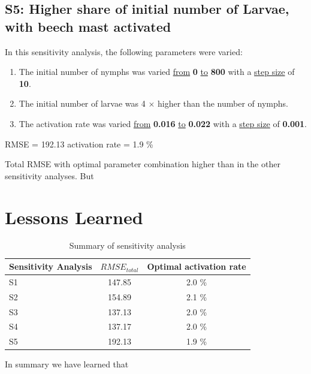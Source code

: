 \documentclass[a4paper, 11pt]{scrartcl}
\begin{document}
\subsection{S5: Higher share of initial number of Larvae, with beech mast activated}
In this sensitivity analysis, the following parameters were varied:

\begin{enumerate}
\item The initial number of nymphs was varied \underline{from} \textbf{0} \underline{to} \textbf{800} with a \underline{step size} of \textbf{10}.
\item The initial number of larvae was 4 $\times$ higher than the number of nymphs.
\item The activation rate was varied \underline{from} \textbf{0.016} \underline{to} \textbf{0.022} with a \underline{step size} of \textbf{0.001}.
\end{enumerate}

RMSE = 192.13
activation rate = 1.9 \%

Total RMSE with optimal parameter combination higher than in the other sensitivity analyses. But


\newpage
\section{Lessons Learned}


\begin{table}[h!]
\caption{Summary of sensitivity analysis}
\label{tab:summary}
\begin{tabularx}{\textwidth}{lcc}
\toprule
\textbf{Sensitivity Analysis} & \textbf{$RMSE_{total}$} & \textbf{Optimal activation rate} \\
\midrule
S1 & 147.85 & 2.0 \% \\
S2 & 154.89 & 2.1 \% \\
S3 & 137.13 & 2.0 \% \\
S4 & 137.17 & 2.0 \% \\
S5 & 192.13 & 1.9 \% \\
\bottomrule
\end{tabularx}
\end{table}



In summary we have learned that
\end{document}
